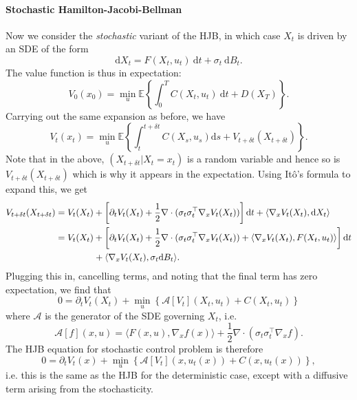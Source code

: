 \documentclass{article}
\newcommand{\diff}{\mathrm{d}}
\newcommand{\E}{\mathbb{E}}
\theoremstyle{newstyle}
\begin{document}
\paragraph{Stochastic Hamilton-Jacobi-Bellman}
Now we consider the \emph{stochastic} variant of the HJB, in which case $X_t$ is driven by an SDE of the form
\begin{equation}
  \diff X_t = F(X_t, u_t) \: \diff t + \sigma_t \: \diff B_t. 
\end{equation}
The value function is thus in expectation:
\begin{equation}
  V_0(x_0) = \min_{u} \E\left\{ \int_0^T C(X_t, u_t) \: \diff t + D(X_T) \right\}. 
\end{equation}
Carrying out the same expansion as before, we have
\begin{equation}
  V_t(x_t) = \min_u \E\left\{ \int_t^{t + \delta t} C(X_s, u_s) \diff s + V_{t + \delta t}(X_{t + \delta t}) \right\}. 
\end{equation}
Note that in the above, $(X_{t + \delta t} | X_t = x_t)$ is a random variable and hence so is $V_{t+\delta t}(X_{t + \delta t})$ which is why it appears in the expectation. Using It\^o's formula to expand this, we get
\begin{align*}
  V_{t + \delta t}(X_{t + \delta t}) &=  V_t(X_t) + \left[ \partial_t V_t(X_t) + \frac{1}{2} \nabla \cdot (\sigma_t \sigma_t^\top \nabla_x V_t(X_t)) \right] \diff t + \langle \nabla_x V_t(X_t), \diff X_t \rangle  \\
                                     &= V_t(X_t) + \left[ \partial_t V_t(X_t) + \frac{1}{2} \nabla \cdot (\sigma_t \sigma_t^\top \nabla_x V_t(X_t)) + \langle \nabla_x V_t(X_t), F(X_t, u_t) \rangle  \right] \diff t \\
                                     & \hspace{4.25em} + \langle \nabla_x V_t(X_t), \sigma_t \diff B_t \rangle . 
\end{align*}
Plugging this in, cancelling terms, and noting that the final term has zero expectation, we find that
\begin{equation}
  0 = \partial_t V_t(X_t) + \min_u \left\{ \mathcal{A}[V_t](X_t, u_t) + C(X_t, u_t) \right\}
\end{equation}
where $\mathcal{A}$ is the generator of the SDE governing $X_t$, i.e.
\begin{equation}
  \mathcal{A}[f](x, u) = \langle F(x, u), \nabla_x f(x) \rangle + \frac{1}{2} \nabla \cdot (\sigma_t \sigma_t^\top \nabla_x f). 
\end{equation}
The HJB equation for stochastic control problem is therefore 
\begin{equation}
  0 = \partial_t V_t(x) + \min_u \left\{ \mathcal{A}[V_t](x, u_t(x)) + C(x, u_t(x)) \right\},
\end{equation}
i.e. this is the same as the HJB for the deterministic case, except with a diffusive term arising from the stochasticity. 
\end{document}
